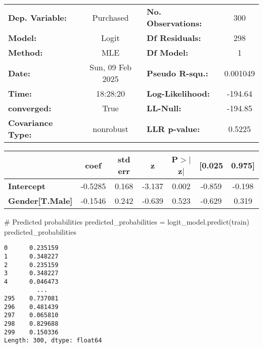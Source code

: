 \documentclass[
  letterpaper,
  DIV=11,
  numbers=noendperiod]{scrreprt}
\newenvironment{Shaded}{\begin{snugshade}}{\end{snugshade}}
\newcommand{\CommentTok}[1]{\textcolor[rgb]{0.37,0.37,0.37}{#1}}
\newcommand{\NormalTok}[1]{\textcolor[rgb]{0.00,0.23,0.31}{#1}}
\newcommand{\OperatorTok}[1]{\textcolor[rgb]{0.37,0.37,0.37}{#1}}
\begin{document}
\begin{center}
\begin{tabular}{lclc}
\toprule
\textbf{Dep. Variable:}   &    Purchased     & \textbf{  No. Observations:  } &      300    \\
\textbf{Model:}           &      Logit       & \textbf{  Df Residuals:      } &      298    \\
\textbf{Method:}          &       MLE        & \textbf{  Df Model:          } &        1    \\
\textbf{Date:}            & Sun, 09 Feb 2025 & \textbf{  Pseudo R-squ.:     } &  0.001049   \\
\textbf{Time:}            &     18:28:20     & \textbf{  Log-Likelihood:    } &   -194.64   \\
\textbf{converged:}       &       True       & \textbf{  LL-Null:           } &   -194.85   \\
\textbf{Covariance Type:} &    nonrobust     & \textbf{  LLR p-value:       } &   0.5225    \\
\bottomrule
\end{tabular}
\begin{tabular}{lcccccc}
                        & \textbf{coef} & \textbf{std err} & \textbf{z} & \textbf{P$> |$z$|$} & \textbf{[0.025} & \textbf{0.975]}  \\
\midrule
\textbf{Intercept}      &      -0.5285  &        0.168     &    -3.137  &         0.002        &       -0.859    &       -0.198     \\
\textbf{Gender[T.Male]} &      -0.1546  &        0.242     &    -0.639  &         0.523        &       -0.629    &        0.319     \\
\bottomrule
\end{tabular}
\end{center}

\begin{Shaded}
\begin{Highlighting}[]
\CommentTok{\# Predicted probabilities}
\NormalTok{predicted\_probabilities }\OperatorTok{=}\NormalTok{ logit\_model.predict(train)}
\NormalTok{predicted\_probabilities}
\end{Highlighting}
\end{Shaded}

\begin{verbatim}
0      0.235159
1      0.348227
2      0.235159
3      0.348227
4      0.046473
         ...   
295    0.737081
296    0.481439
297    0.065810
298    0.829688
299    0.150336
Length: 300, dtype: float64
\end{verbatim}
\end{document}
